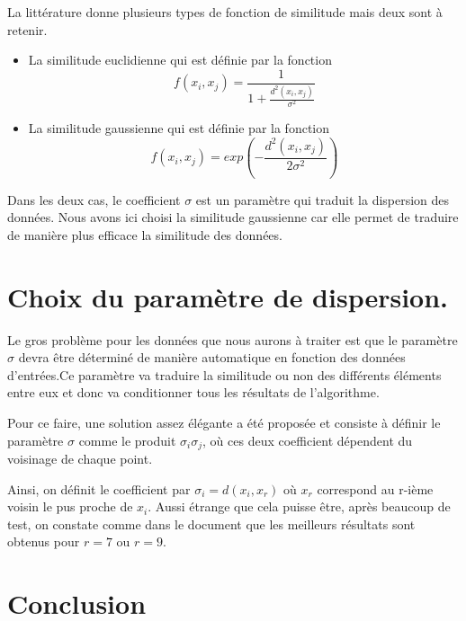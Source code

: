 La littérature donne plusieurs types de fonction de similitude mais deux sont à retenir.
\begin{itemize}

\item La similitude euclidienne qui est définie par la fonction \\
\begin{equation}
f(x_i,x_j) = \frac{1}{1+\frac{d^2(x_i,x_j)}{\sigma^2}}
\end{equation}

\item La similitude gaussienne qui est définie par la fonction \\
\begin{equation}
f(x_i,x_j) = exp(-\frac{d^2(x_i,x_j)}{2\sigma^2})
\end{equation}

\end{itemize}


Dans les deux cas, le coefficient $\sigma$ est un paramètre qui traduit la dispersion des données. Nous avons ici choisi la similitude gaussienne car elle permet de traduire de manière plus efficace la similitude des données.
 
\section{Choix du paramètre de dispersion.}

Le gros problème pour les données que nous aurons à traiter est que le paramètre $\sigma$ devra être déterminé de manière automatique en fonction des données d'entrées.Ce paramètre va traduire la similitude ou non des différents éléments entre eux et donc va conditionner tous les résultats de l'algorithme.

\medskip

Pour ce faire, une solution assez élégante a été proposée \cite{zelnik2004self} et consiste à définir le paramètre $\sigma$ comme le produit $\sigma_i\sigma_j$, où ces deux coefficient dépendent du voisinage de chaque point.

\medskip

Ainsi, on définit le coefficient par $\sigma_i = d(x_i,x_r)$ où $x_r$ correspond au r-ième voisin le pus proche de $x_i$. Aussi étrange que cela puisse être, après beaucoup de test, on constate comme dans le document \cite{tartare2014contribution} que les meilleurs résultats sont obtenus pour $r=7$ ou $r=9$.

\section*{Conclusion}

